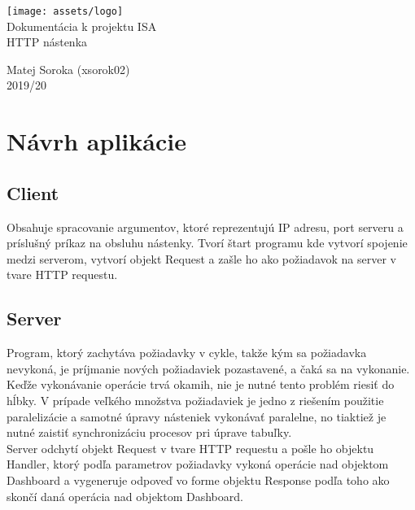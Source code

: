 \documentclass[a4paper,12pt,oneside]{article}
\theoremstyle{definition}
\theoremstyle{definition}
\theoremstyle{definition}
\begin{document}
\begin{titlepage}
  \begin{center}
    \texttt{[image: assets/logo]}\\[50mm]
    {\Huge Dokumentácia k projektu ISA}\\[5mm]
    {\Huge HTTP nástenka}\\
    \begin{flushleft}
      \Large{Matej Soroka (xsorok02) \\ 2019/20}
    \end{flushleft}
  \end{center}
\end{titlepage}

\tableofcontents
\newpage

\section{Návrh aplikácie}

\subsection{Client}
Obsahuje spracovanie argumentov, ktoré reprezentujú IP adresu, port serveru a príslušný príkaz na obsluhu nástenky. Tvorí štart programu kde vytvorí spojenie medzi serverom, vytvorí objekt Request a zašle ho ako požiadavok na server v tvare HTTP requestu.

\subsection{Server}
Program, ktorý zachytáva požiadavky v cykle, takže kým sa požiadavka nevykoná, je príjmanie nových požiadaviek pozastavené, a čaká sa na vykonanie. Keďže vykonávanie operácie trvá okamih, nie je nutné tento problém riesiť do hĺbky. V prípade veľkého množstva požiadaviek je jedno z riešením použitie paralelizácie a samotné úpravy násteniek vykonávať paralelne, no tiaktiež je nutné zaistiť synchronizáciu procesov pri úprave tabuľky.  \\

Server odchytí objekt Request v tvare HTTP requestu a pošle ho objektu Handler, ktorý podľa parametrov požiadavky vykoná operácie nad objektom Dashboard a vygeneruje odpoveď vo forme objektu Response podľa toho ako skončí daná operácia nad objektom Dashboard. \\
\end{document}
